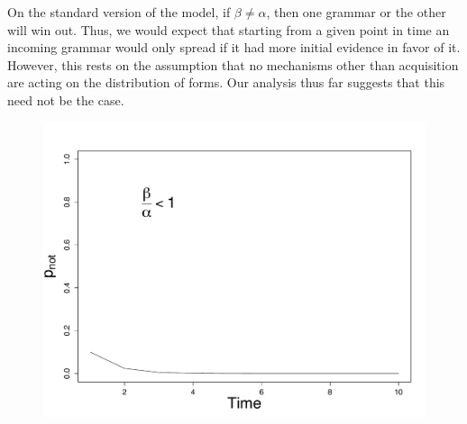 \begin{figure}
 \begin{center}
     \end{center}
\end{figure}


On the standard version of the model, if $\beta \neq \alpha$, then one grammar or the other will win out. Thus, we would expect that starting from a given point in time an incoming grammar would only spread if it had more initial evidence in favor of it. However, this rests on the assumption that no mechanisms other than acquisition are acting on the distribution of forms. Our analysis thus far suggests that this need not be the case.


\begin{figure}
\begin{center}
 \includegraphics[width=\textwidth]{loss-solution.pdf}\\
\end{center}
	\caption{}
\end{figure}


